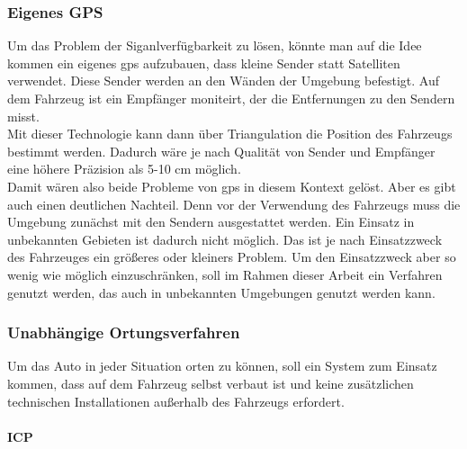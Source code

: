 \subsubsection{Eigenes GPS}
Um das Problem der Siganlverfügbarkeit zu lösen, könnte man auf die Idee kommen ein eigenes \acf{gps} aufzubauen, dass kleine Sender statt Satelliten verwendet.
Diese Sender werden an den Wänden der Umgebung befestigt. Auf dem Fahrzeug ist ein Empfänger moniteirt, der die Entfernungen zu den Sendern misst.\\
Mit dieser Technologie kann dann über Triangulation die Position des Fahrzeugs bestimmt werden. Dadurch wäre je nach Qualität von Sender und Empfänger eine höhere Präzision als 
5-10 cm möglich. \\
Damit wären also beide Probleme von \ac{gps} in diesem Kontext gelöst. Aber es gibt auch einen deutlichen Nachteil. Denn vor der Verwendung des Fahrzeugs muss die Umgebung zunächst
mit den Sendern ausgestattet werden. Ein Einsatz in unbekannten Gebieten ist dadurch nicht möglich. Das ist je nach Einsatzzweck des Fahrzeuges ein größeres oder kleiners Problem.
Um den Einsatzzweck aber so wenig wie möglich einzuschränken, soll im Rahmen dieser Arbeit ein Verfahren genutzt werden, das auch in unbekannten Umgebungen genutzt werden kann.

\subsubsection{Unabhängige Ortungsverfahren}
Um das Auto in jeder Situation orten zu können, soll ein System zum Einsatz kommen, dass auf dem Fahrzeug selbst verbaut ist und keine zusätzlichen technischen Installationen außerhalb des Fahrzeugs erfordert.\\

\paragraph{ICP}

\newpage
